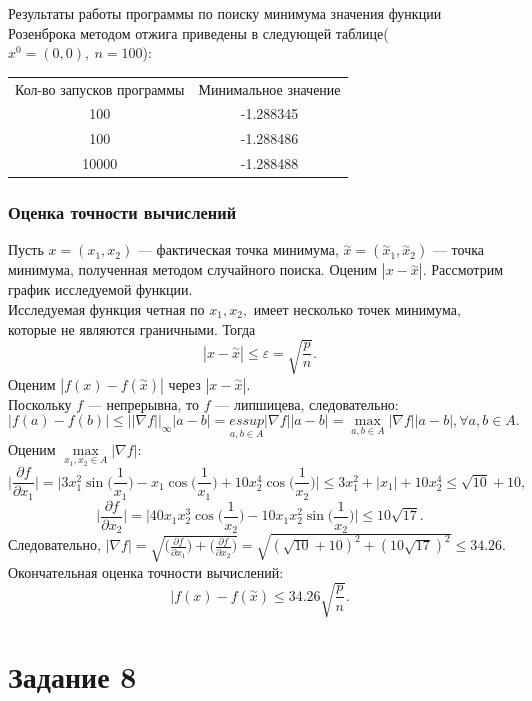\documentclass[11pt]{article}
\begin{document}
Результаты работы программы по поиску минимума значения функции Розенброка методом отжига приведены в следующей таблице($x^0 = (0,0), \ n = 100$):
\begin{center}
	\begin{tabular}{|c|c|}
		\hline
		Кол-во запусков программы & Минимальное значение \\
		100 & -1.288345  \\
		100 & -1.288486   \\
		10000 & -1.288488 \\
		
		\hline
	\end{tabular}
\end{center}
\subsubsection{Оценка точности вычислений}
Пусть $x = (x_1,x_2)$ --- фактическая точка минимума, $\overset{\sim}{x} =  (\overset{\sim}{x}_1,\overset{\sim}{x}_2)$ --- точка минимума, полученная методом случайного поиска. Оценим $|x - \overset{\sim}{x}|.$ Рассмотрим график исследуемой функции.\\
Исследуемая функция четная по $x_1,x_2,$ имеет несколько точек минимума, которые не являются граничными. Тогда
\[ |x - \overset{\sim}{x}| \leq \varepsilon = \sqrt{\frac{p}{n}}. \]
Оценим $|f(x) - f(\overset{\sim}{x})|$ через $|x - \overset{\sim}{x}|$.\\
Поскольку $f$ --- непрерывна, то $f$ --- липшицева, следовательно:
\[|f(a) - f(b)| \leq ||\nabla f ||_\infty |a-b| = \underset{a,b\in A}{essup}|\nabla f||a-b| = \underset{a,b \in A}{\max}|\nabla f||a-b|, \forall a,b \in A. \]
Оценим $\underset{x_1,x_2 \in A}{\max}|\nabla f|:$
\[ \bigg|\frac{\partial f}{\partial x_1}\bigg| = \bigg|3x_1^2\sin\bigg(\frac{1}{x_1}\bigg) - x_1\cos\bigg(\frac{1}{x_1}\bigg) + 10x_2^4\cos\bigg(\frac{1}{x_2}\bigg) \bigg| \leq 3x_1^2 + |x_1| + 10x_2^4 \leq \sqrt{10} + 10, \]
\[ \bigg|\frac{\partial f}{\partial x_2}\bigg| = \bigg|40x_1x_2^3\cos\bigg(\frac{1}{x_2}\bigg) - 10x_1x_2^2 \sin\bigg(\frac{1}{x_2}\bigg) \bigg| \leq 10\sqrt{17}. \]
Следовательно, $|\nabla f| = \sqrt{\big(\frac{\partial f}{\partial x_1}\big) + \big(\frac{\partial f}{\partial x_2} \big)} = \sqrt{(\sqrt{10} + 10)^2 + (10\sqrt{17})^2}\leq 34.26.$
Окончательная оценка точности вычислений:
\[ |f(x) - f(\overset{\sim}{x}) \leq 34.26 \sqrt{\frac{p}{n}}. \]

\newpage

\section{Задание 8}
\end{document}
